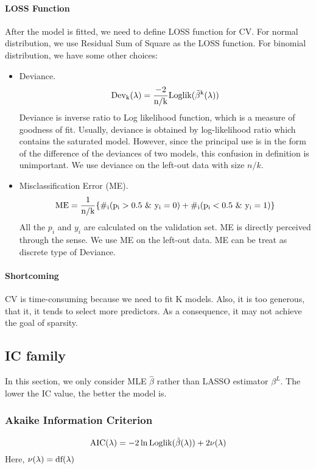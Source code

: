 \documentclass[]{article}
\begin{document}
\paragraph{LOSS Function}
After the model is fitted, we need to define LOSS function for CV. For normal distribution, we use Residual Sum of Square as the LOSS function. For binomial distribution, we have some other choices:
\begin{itemize}
	\item Deviance.
		\begin{equation}
			\rm Dev_k(\lambda)=\frac{-2}{n/k}\rm Loglik(\tilde{\beta}^{k}(\lambda))
		\end{equation}
		Deviance is inverse ratio to Log likelihood function, which is a measure of goodness of fit. Usually, deviance is obtained by log-likelihood ratio which contains the saturated model. However, since the principal use is in the form of the difference of the deviances of two models, this confusion in definition is unimportant. We use deviance on the left-out data with size $n/k$.
	\item Misclassification Error (ME).
		\begin{equation}
		\rm ME=\frac{1}{n/k}\{ \#_i(p_i>0.5\ \&\ y_i=0)+\#_i(p_i<0.5\ \&\  y_i=1)\}
		\end{equation}
		All the $ p_i $ and $y_i$ are calculated on the validation set. ME is directly perceived through the sense. We use ME on the left-out data. ME can be treat as discrete type of Deviance.
\end{itemize}

\paragraph{Shortcoming}
CV is time-consuming because we need to fit K models. Also, it is too generous, that it, it tends to select more predictors. As a consequence, it may not achieve the goal of sparsity.

\subsection{IC family}
In this section, we only consider MLE $ \hat{\beta} $ rather than LASSO estimator $ \beta^{L} $. The lower the IC value, the better the model is.
\subsubsection{Akaike Information Criterion}
\begin{equation}
\rm AIC(\lambda)=-2\ln \rm Loglik(\hat{\beta}(\lambda))+2\nu(\lambda)
\end{equation}
Here, $ \nu(\lambda)=\rm df(\lambda) $
\end{document}
